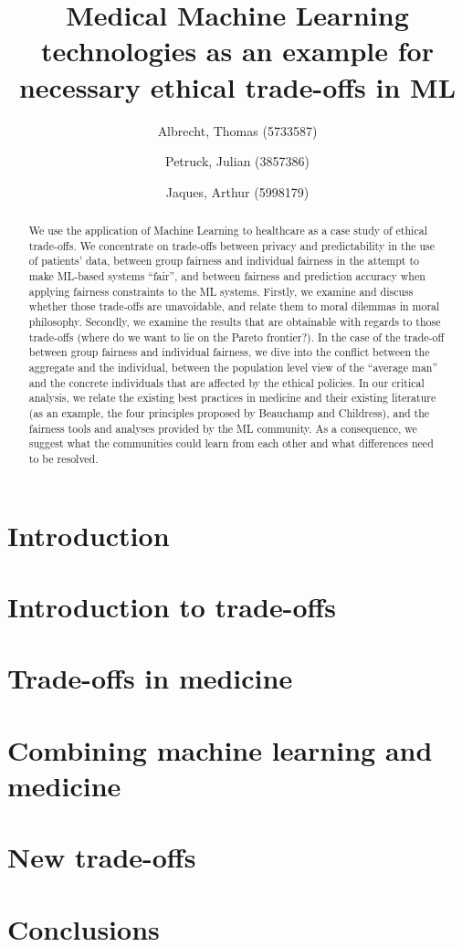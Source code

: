 \documentclass[11pt,english]{article}
\title{Medical Machine Learning technologies as an example for necessary ethical trade-offs in ML}
\author{
    Albrecht, Thomas (5733587)
    \and
    Petruck, Julian (3857386)
    \and
    Jaques, Arthur (5998179)}
\newcommand{\idea}[1]{\color{blue}{#1}\color{black}}
\begin{document}
\maketitle

\begin{abstract}
	\idea{To change!}
	We use the application of Machine Learning to healthcare as a case study of ethical trade-offs.
	We concentrate on trade-offs between privacy and predictability in the use of patients' data, between group fairness and individual fairness in the attempt to make ML-based systems ``fair'', and between fairness and prediction accuracy when applying fairness constraints to the ML systems.
	Firstly, we examine and discuss whether those trade-offs are unavoidable, and relate them to moral dilemmas in moral philosophy.
	Secondly, we examine the results that are obtainable with regards to those trade-offs (where do we want to lie on the Pareto frontier?).
	In the case of the trade-off between group fairness and individual fairness, we dive into the conflict between the aggregate and the individual, between the population level view of the ``average man'' and the concrete individuals that are affected by the ethical policies.
	In our critical analysis, we relate the existing best practices in medicine and their existing literature (as an example, the four principles proposed by Beauchamp and Childress), and the fairness tools and analyses provided by the ML community.
	As a consequence, we suggest what the communities could learn from each other and what differences need to be resolved.
\end{abstract}


\clearpage
\setcounter{tocdepth}{2}
\tableofcontents
\clearpage


\section{Introduction}


\section{Introduction to trade-offs}


\section{Trade-offs in medicine}


\section{Combining machine learning and medicine}


\section{New trade-offs}


\section{Conclusions}


%
\clearpage


\printbibliography
\end{document}
